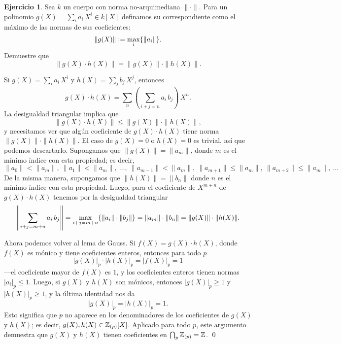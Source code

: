 \documentclass{article}
\numberwithin{equation}{section}
\theoremstyle{definition}
\newtheorem{ejerc}{Ejercicio}
\begin{document}
\begin{ejerc}
  Sea $k$ un cuerpo con norma no-arquimediana $\|\cdot\|$. Para un polinomio
  $g (X) = \sum_i a_i\,X^i \in k [X]$ definamos su 
  correspondiente como el máximo de las normas de sus coeficientes:
  $$\|g (X)\| \mathrel{\mathop:}= \max_i \{ \|a_i\| \}.$$
  Demuestre que
  $$\|g (X)\cdot h (X)\| = \|g (X)\|\cdot \|h (X)\|.$$

  \ifdefined\solutions\begin{solucion}
    Si $g (X) = \sum_i a_i\,X^i$ y $h (X) = \sum_j b_j\,X^j$, entonces
    $$g (X)\cdot h (X) = \sum_n \left(\sum_{i+j = n} a_i\,b_j\right)\,X^n.$$
    La desigualdad triangular implica que
    $$\|g (X)\cdot h (X)\| \le \|g (X)\|\cdot \|h (X)\|,$$
    y necesitamos ver que algún coeficiente de $g (X)\cdot h (X)$ tiene norma
    $\|g (X)\|\cdot \|h (X)\|$. El caso de $g (X) = 0$ o $h (X) = 0$ es trivial,
    así que podemos descartarlo. Supongamos que $\|g (X)\| = \|a_m\|$, donde $m$
    es el mínimo índice con esta propiedad; es decir,
    \[ \|a_0\| < \|a_m\|, ~
       \|a_1\| < \|a_m\|, ~
       \ldots, ~
       \|a_{m-1}\| < \|a_m\|, ~
       \|a_{m+1}\| \le \|a_m\|, ~
       \|a_{m+2}\| \le \|a_m\|, ~
       \ldots \]
    De la misma manera, supongamos que $\|h (X)\| = \|b_n\|$ donde $n$ es
    el mínimo índice con esta propiedad. Luego, para el coeficiente de $X^{m+n}$
    de $g (X)\cdot h (X)$ tenemos por la desigualdad triangular
    \[ \left\|\sum_{i+j = m+n} a_i\,b_j\right\| =
       \max_{i+j = m+n} \{\|a_i\|\cdot\|b_j\| \} =
       \|a_m\|\cdot\|b_n\| = \|g (X)\|\cdot\|h (X)\|. \qedhere \]
  \end{solucion}\fi
\end{ejerc}

Ahora podemos volver al lema de Gauss. Si $f (X) = g (X)\cdot h (X)$, donde
$f (X)$ es mónico y tiene coeficientes enteros, entonces para todo $p$
$$|g (X)|_p \cdot |h (X)|_p = |f (X)|_p = 1$$
---el coeficiente mayor de $f (X)$ es $1$, y los coeficientes enteros tienen
normas $|a_i|_p \le 1$. Luego, si $g (X)$ y $h (X)$ son mónicos, entonces
$|g (X)|_p \ge 1$ y $|h (X)|_p \ge 1$, y la última identidad nos da
$$|g (X)|_p = |h (X)|_p = 1.$$
Esto significa que $p$ no aparece en los denominadores de los coeficientes
de $g (X)$ y $h (X)$; es decir, $g (X), h (X) \in \mathbb{Z}_{(p)} [X]$. Aplicado para
todo $p$, este argumento demuestra que $g (X)$ y $h (X)$ tienen coeficientes
en $\bigcap_p \mathbb{Z}_{(p)} = \mathbb{Z}$. \qed

\vspace{1em}
\end{document}
